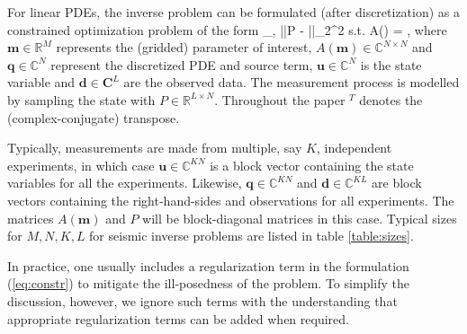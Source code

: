 \documentclass{iopart}
\begin{document}
For linear PDEs, the inverse problem can be formulated (after discretization) as a constrained optimization problem of the form
\bq
\label{eq:constr}
\min_{,} ||P - ||_2^2  \quad 
\mbox{s.t.} \quad A() = ,
\eq
where $\mathbf{m}\in\mathbb{R}^{M}$ represents the (gridded) parameter of interest, $A(\mathbf{m})\in\mathbb{C}^{N\times N}$ and $\mathbf{q}\in\mathbb{C}^{N}$ represent the discretized PDE and source term, $\mathbf{u}\in\mathbb{C}^{N}$ is the state variable and $\mathbf{d}\in \mathbf{C}^{L}$ are the observed data. The measurement process is modelled by sampling the state with $P\in \mathbb{R}^{L\times N}$. Throughout the paper $^T$ denotes the (complex-conjugate) transpose.  

Typically, measurements are made from multiple, say $K$, independent experiments,
in which case $\mathbf{u} \in \mathbb{C}^{KN}$ is a block vector containing the state variables for all the experiments. Likewise, $\mathbf{q}\in \mathbb{C}^{KN}$ and $\mathbf{d}\in \mathbb{C}^{KL}$ are block vectors containing the right-hand-sides and observations for all experiments. The matrices $A(\mathbf{m})$ and $P$ will be block-diagonal matrices in this case. Typical sizes for $M,N,K,L$ for seismic inverse problems are listed in table \ref{table:sizes}.

In practice, one usually includes a regularization term in the formulation (\ref{eq:constr}) to mitigate the ill-posedness of the problem. To simplify the discussion, however, we ignore such terms with the understanding that appropriate regularization terms can be added when required.
\end{document}
